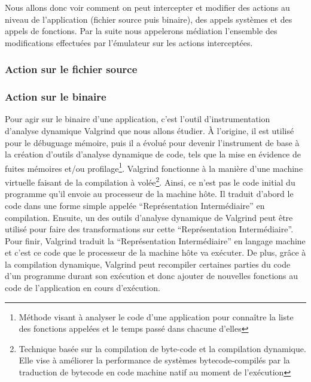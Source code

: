Nous allons donc voir comment on peut intercepter et modifier des actions au
niveau de l'application (fichier source puis binaire), des appels systèmes et
des appels de fonctions. Par la suite nous appelerons médiation l'ensemble des
modifications effectuées par l'émulateur sur les actions interceptées.

\subsubsection{Action sur le fichier source}

\subsubsection{Action sur le binaire}
Pour agir sur le binaire d'une application, c'est l'outil d'instrumentation
d'analyse dynamique Valgrind \citep{Valgrind, Valgrindweb} que nous allons étudier. À l'origine, il est utilisé
pour le débuguage mémoire, puis il a évolué pour devenir l'instrument de base à
la création d'outils d'analyse dynamique de code, tels que la mise en évidence
de fuites mémoires et/ou profilage\footnote{Méthode visant à analyser le code
  d'une application pour connaître la liste des fonctions appelées et le temps
  passé dans chacune d'elles}. Valgrind fonctionne à la manière d'une machine
virtuelle faisant de la compilation à volée\footnote{Technique basée sur la
  compilation de byte-code et la compilation dynamique. Elle vise à améliorer la
  performance de systèmes bytecode-compilés par la traduction de bytecode en
  code machine natif au moment de l'exécution}. Ainsi, ce n'est pas le code
initial du programme qu'il envoie au processeur de la machine hôte. Il traduit
d'abord le code dans une forme simple appelée ``Représentation Intermédiaire''
en compilation. Ensuite, un des outils d'analyse dynamique de Valgrind peut être
utilisé pour faire des transformations sur cette ``Représentation
Intermédiaire''. Pour finir, Valgrind traduit la ``Représentation
Intermédiaire'' en langage machine et c'est ce code que le processeur de la
machine hôte va exécuter. De plus, grâce à la compilation dynamique, Valgrind
peut recompiler certaines parties du code d'un programme durant son exécution et
donc ajouter de nouvelles fonctions au code de l'application en cours
d'exécution.

